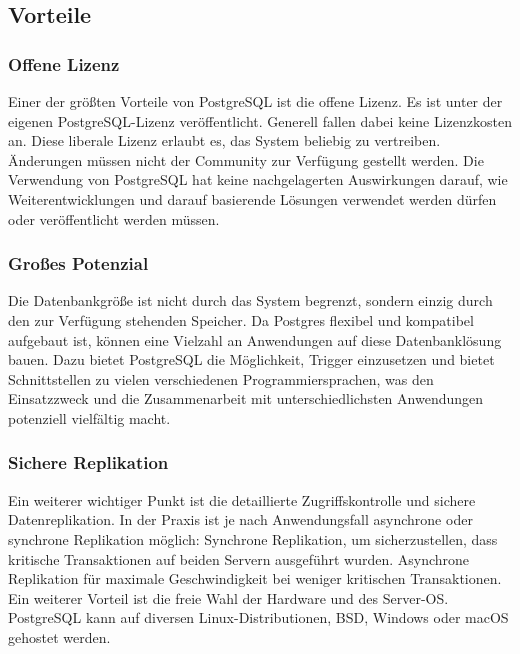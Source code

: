 \subsection{Vorteile}

\subsubsection{Offene Lizenz}
Einer der größten Vorteile von PostgreSQL ist die offene Lizenz. Es ist unter der eigenen PostgreSQL-Lizenz veröffentlicht. Generell fallen dabei keine Lizenzkosten an. 
Diese liberale Lizenz erlaubt es, das System beliebig zu vertreiben. Änderungen müssen nicht der Community zur Verfügung gestellt werden. Die Verwendung von PostgreSQL hat 
keine nachgelagerten Auswirkungen darauf, wie Weiterentwicklungen und darauf basierende Lösungen verwendet werden dürfen oder veröffentlicht werden müssen.
\cite{sysarch-postgresql-1}

\subsubsection{Großes Potenzial}

Die Datenbankgröße ist nicht durch das System begrenzt, sondern einzig durch den zur Verfügung stehenden Speicher. Da Postgres flexibel und kompatibel aufgebaut ist, 
können eine Vielzahl an Anwendungen auf diese Datenbanklösung bauen. Dazu bietet PostgreSQL die Möglichkeit, 
Trigger einzusetzen und bietet Schnittstellen zu vielen verschiedenen Programmiersprachen, was den Einsatzzweck und die Zusammenarbeit mit unterschiedlichsten Anwendungen potenziell vielfältig macht.
\cite{sysarch-postgresql-1}

\subsubsection{Sichere Replikation}

Ein weiterer wichtiger Punkt ist die detaillierte Zugriffskontrolle und sichere Datenreplikation. In der Praxis ist je nach Anwendungsfall asynchrone oder synchrone Replikation möglich: 
Synchrone Replikation, um sicherzustellen, dass kritische Transaktionen auf beiden Servern ausgeführt wurden. Asynchrone Replikation für maximale Geschwindigkeit bei weniger kritischen Transaktionen. 
Ein weiterer Vorteil ist die freie Wahl der Hardware und des Server-OS. PostgreSQL kann auf diversen Linux-Distributionen, BSD, Windows oder macOS 
gehostet werden.
\cite{sysarch-postgresql-1}

